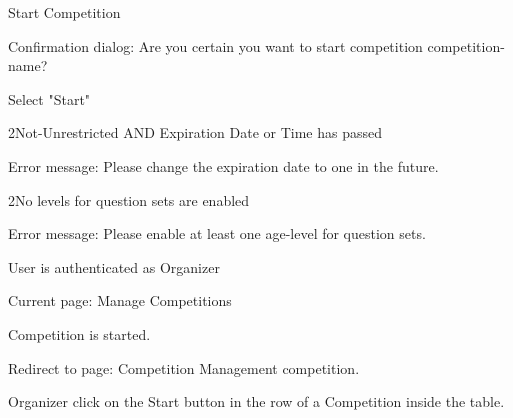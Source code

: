 
\begin{uc}{Start Competition}

    \begin{uc-mss}
    \item Confirmation dialog: Are you certain you want to start competition {competition-
    name}?
    \item Select "Start"
    \end{uc-mss}

    \begin{uc-ext}

        \begin{uc-fail}{2}{Not-Unrestricted AND Expiration Date or Time has passed}
        \item Error message: Please change the expiration date to one in the future.
        \end{uc-fail}

        \begin{uc-fail}{2}{No levels for question sets are enabled}
        \item Error message: Please enable at least one age-level for question sets.
        \end{uc-fail}

    \end{uc-ext}

    \begin{uc-pre}
    \item User is authenticated as Organizer
    \item Current page: Manage Competitions
    \end{uc-pre}

    \begin{uc-post}
    \item Competition is started.
    \item Redirect to page: Competition Management {competition}.
    \end{uc-post}

    \begin{uc-trig}
        Organizer click on the Start button in the row of a Competition inside the
        table.
    \end{uc-trig}

\end{uc}
